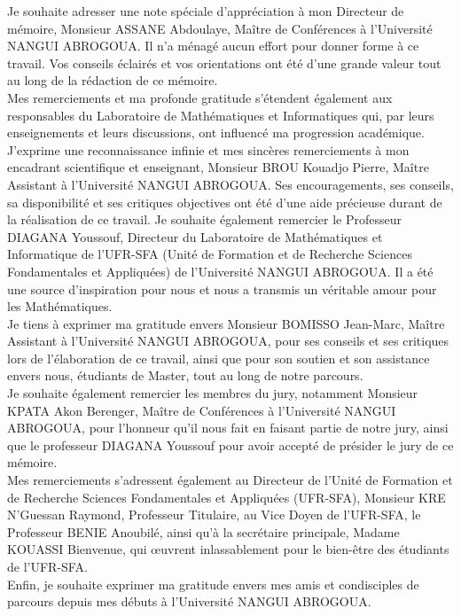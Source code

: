 Je souhaite adresser une note spéciale d'appréciation à mon Directeur de mémoire, Monsieur ASSANE Abdoulaye, Maître de Conférences à l'Université NANGUI ABROGOUA. Il n'a ménagé aucun effort pour donner forme à ce travail. Vos conseils éclairés et vos orientations ont été d'une grande valeur tout au long de la rédaction de ce mémoire.\\
Mes remerciements et ma profonde gratitude s'étendent également aux responsables du Laboratoire de Mathématiques et Informatiques qui, par leurs enseignements et leurs discussions, ont influencé ma progression académique.\\
J'exprime une reconnaissance infinie et mes sincères remerciements à mon encadrant scientifique et enseignant, Monsieur BROU Kouadjo Pierre, Maître Assistant à l'Université NANGUI ABROGOUA. Ses encouragements, ses conseils, sa disponibilité et ses critiques objectives ont été d'une aide précieuse durant de la réalisation de ce travail. Je souhaite également remercier le Professeur DIAGANA Youssouf, Directeur du Laboratoire de Mathématiques et Informatique de l'UFR-SFA (Unité de Formation et de Recherche Sciences Fondamentales et Appliquées) de l'Université NANGUI ABROGOUA. Il a été une source d'inspiration pour nous et nous a transmis un véritable amour pour les Mathématiques.\\
Je tiens à exprimer ma gratitude envers Monsieur BOMISSO Jean-Marc, Maître Assistant à l'Université NANGUI ABROGOUA, pour ses conseils et ses critiques lors de l'élaboration de ce travail, ainsi que pour son soutien et son assistance envers nous, étudiants de Master, tout au long de notre parcours.\\
Je souhaite également remercier les membres du jury, notamment Monsieur KPATA Akon Berenger, Maître de Conférences à l'Université NANGUI ABROGOUA, pour l'honneur qu'il nous fait en faisant partie de notre jury, ainsi que le professeur DIAGANA Youssouf pour avoir accepté de présider le jury de ce mémoire.\\
Mes remerciements s'adressent également au Directeur de l'Unité de Formation et de Recherche Sciences Fondamentales et Appliquées (UFR-SFA), Monsieur KRE N'Guessan Raymond, Professeur Titulaire, au Vice Doyen de l'UFR-SFA, le Professeur BENIE Anoubilé, ainsi qu'à la secrétaire principale, Madame KOUASSI Bienvenue, qui œuvrent inlassablement pour le bien-être des étudiants de l'UFR-SFA.\\
Enfin, je souhaite exprimer ma gratitude envers mes amis et condisciples de parcours depuis mes débuts à l'Université NANGUI ABROGOUA.
